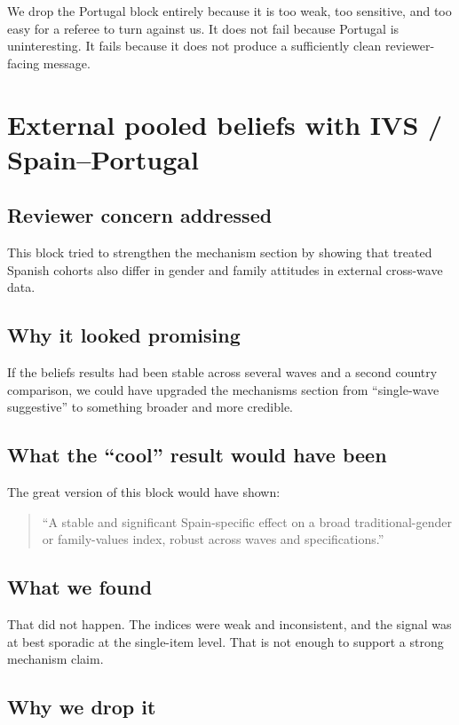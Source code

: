 \documentclass[11pt]{article}
\begin{document}
We drop the Portugal block entirely because it is too weak, too sensitive, and too easy for a referee to turn against us. It does not fail because Portugal is uninteresting. It fails because it does not produce a sufficiently clean reviewer-facing message.

\section{External pooled beliefs with IVS / Spain--Portugal}

\subsection*{Reviewer concern addressed}

This block tried to strengthen the mechanism section by showing that treated Spanish cohorts also differ in gender and family attitudes in external cross-wave data.

\subsection*{Why it looked promising}

If the beliefs results had been stable across several waves and a second country comparison, we could have upgraded the mechanisms section from ``single-wave suggestive'' to something broader and more credible.

\subsection*{What the ``cool'' result would have been}

The great version of this block would have shown:
\begin{quote}
``A stable and significant Spain-specific effect on a broad traditional-gender or family-values index, robust across waves and specifications.''
\end{quote}

\subsection*{What we found}

That did not happen. The indices were weak and inconsistent, and the signal was at best sporadic at the single-item level. That is not enough to support a strong mechanism claim.

\subsection*{Why we drop it}
\end{document}
